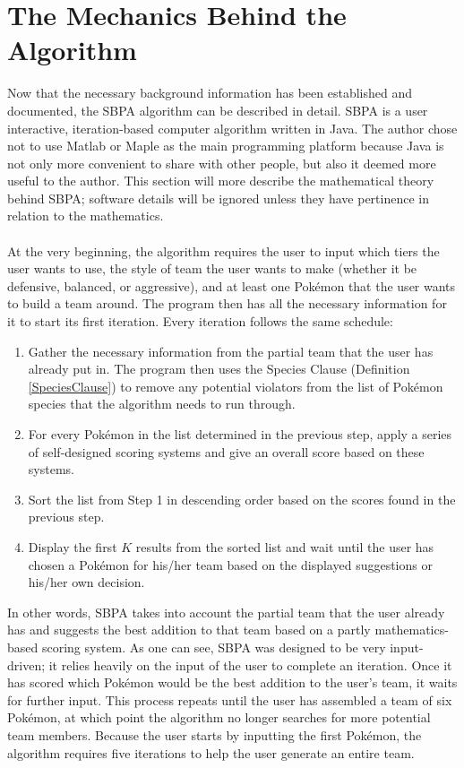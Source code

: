 \documentclass{article}
\begin{document}
\section{The Mechanics Behind the Algorithm}
Now that the necessary background information has been established and documented, the SBPA algorithm can be described in detail. SBPA is a user interactive, iteration-based computer algorithm written in Java. The author chose not to use Matlab or Maple as the main programming platform because Java is not only more convenient to share with other people, but also it deemed more useful to the author. This section will more describe the mathematical theory behind SBPA; software details will be ignored unless they have pertinence in relation to the mathematics.\\\\
At the very beginning, the algorithm requires the user to input which tiers the user wants to use, the style of team the user wants to make (whether it be defensive, balanced, or aggressive), and at least one Pok\'emon that the user wants to build a team around. The program then has all the necessary information for it to start its first iteration. Every iteration  follows the same schedule:
\begin{enumerate}
	\item Gather the necessary information from the partial team that the user has already put in. The program then uses the Species Clause (Definition \ref{SpeciesClause}) to remove any potential violators from the list of Pok\'emon species that the algorithm needs to run through.
	\item For every Pok\'emon in the list determined in the previous step, apply a series of self-designed scoring systems and give an overall score based on these systems.
	\item Sort the list from Step 1 in descending order based on the scores found in the previous step.
	\item Display the first $K$ results from the sorted list and wait until the user has chosen a Pok\'emon for his/her team based on the displayed suggestions or his/her own decision.
\end{enumerate}
In other words, SBPA takes into account the partial team that the user already has and suggests the best addition to that team based on a partly mathematics-based scoring system. As one can see, SBPA was designed to be very input-driven; it relies heavily on the input of the user to complete an iteration. Once it has scored which Pok\'emon would be the best addition to the user's team, it waits for further input. This process repeats until the user has assembled a team of six Pok\'emon, at which point the algorithm no longer searches for more potential team members. Because the user starts by inputting the first Pok\'emon, the algorithm requires five iterations to help the user generate an entire team.\\\\
\end{document}
